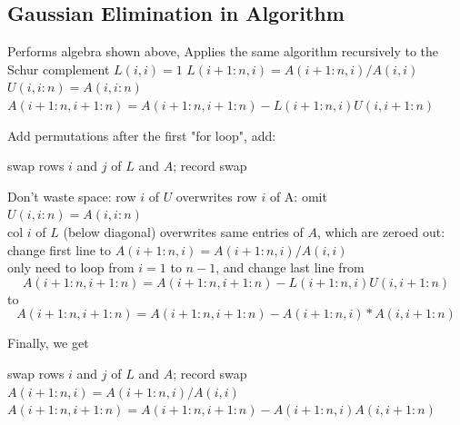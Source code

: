 \documentclass[11pt]{article}
\numberwithin{equation}{section}
\begin{document}
\subsection{Gaussian Elimination in Algorithm}
\begin{algorithmfrm}
    \begin{algorithmic}[1]
                \State Performs algebra shown above,
            \Else {}
                    \State Applies the same algorithm recursively to the Schur complement
                \EndIf
            \EndIf 
            \State $L(i,i)=1$
            \State $L(i+1:n,i) = A(i+1:n,i)/A(i,i)$ 
            \State $U(i,i:n) = A(i,i:n)$
                \State $A(i+1:n,i+1:n) = A(i+1:n,i+1:n) - L(i+1:n,i) U(i,i+1:n)$
            \EndIf
        \EndFor
    \end{algorithmic}
\end{algorithmfrm}

Add permutations after the first "for loop", add:
\begin{algorithmfrm}
    \begin{algorithmic}[1]
            \State swap rows $i$ and $j$ of $L$ and $A$; record swap 
        \EndIf
    \end{algorithmic}
\end{algorithmfrm}

Don't waste space:
row $i$ of $U$ overwrites row $i$ of A: omit $U(i,i:n) = A(i,i:n)$ \\
col $i$ of $L$ (below diagonal) overwrites same entries of $A$, which are zeroed out: change first line to $A(i+1:n,i) = A(i+1:n,i)/A(i,i)$\\
only need to loop from $i = 1$ to $n-1$, and change last line from
$$A(i+1:n,i+1:n) = A(i+1:n,i+1:n) - L(i+1:n,i)U(i,i+1:n)$$
to
$$A(i+1:n,i+1:n) = A(i+1:n,i+1:n) - A(i+1:n,i)*A(i,i+1:n)$$

Finally, we get
\begin{algorithmfrm}
    \begin{algorithmic}[1]
            \State swap rows $i$ and $j$ of $L$ and $A$; record swap
            \State $A(i+1:n,i) = A(i+1:n,i)/A(i,i)$ 
            \State $A(i+1:n,i+1:n) = A(i+1:n,i+1:n) - A(i+1:n,i)A(i,i+1:n)$
        \EndIf
        \EndFor
    \end{algorithmic}
\end{algorithmfrm}
\end{document}
